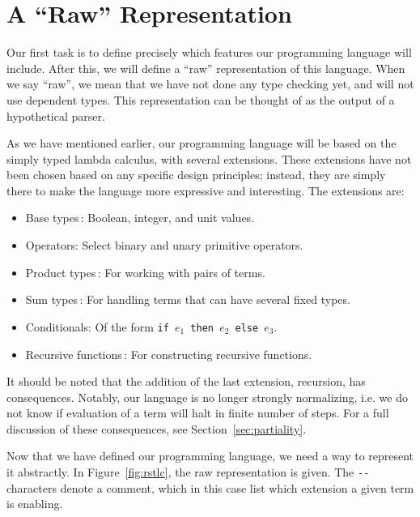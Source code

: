 \section{A ``Raw'' Representation}
\label{sec:the-simply-typed-lambda-calculus}

Our first task is to define precisely which features our programming language will include. After this, we will define a ``raw'' representation of this language. When we say ``raw'', we mean that we have not done any type checking yet, and will not use dependent types. This representation can be thought of as the output of a hypothetical parser. 

As we have mentioned earlier, our programming language will be based on the simply typed lambda calculus, with several extensions. These extensions have not been chosen based on any specific design principles; instead, they are simply there to make the language more expressive and interesting. The extensions are:
\begin{itemize}
\item Base types\,\cite[pp. 117]{Pierce:TypeSystems}: Boolean, integer, and unit values.
\item Operators: Select binary and unary primitive operators.
\item Product types\,\cite[pp. 126]{Pierce:TypeSystems}: For working with pairs of terms.
\item Sum types\,\cite[pp. 132]{Pierce:TypeSystems}: For handling terms that can have several fixed types.
\item Conditionals: Of the form \texttt{if $e_{1}$ then $e_{2}$ else $e_{3}$}.
\item Recursive functions\,\cite[pp. 142]{Pierce:TypeSystems}: For constructing recursive functions.
\end{itemize}

It should be noted that the addition of the last extension, recursion, has consequences. Notably, our language is no longer strongly normalizing, i.e. we do not know if evaluation of a term will halt in finite number of steps. For a full discussion of these consequences, see Section~\ref{sec:partiality}.

Now that we have defined our programming language, we need a way to represent it abstractly. In Figure~\ref{fig:rstlc}, the raw representation is given. The \verb+--+ characters denote a comment, which in this case list which extension a given term is enabling.

